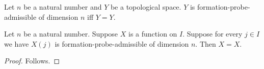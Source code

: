 



\begin{definition}\label{formation_probe_admissible}
    Let $n$ be a natural number and $Y$ be a topological space.
    $Y$ is formation-probe-admissible of dimension $n$ iff $Y=Y$.
\end{definition}
\begin{theorem}\label{formation_probe_missing_domain}
    Let $n$ be a natural number.
    Suppose $X$ is a function on $I$.
    Suppose for every $j\in I$ we have $X(j)$ is formation-probe-admissible of dimension $n$.
    Then $X=X$.
\end{theorem}
\begin{proof}
    Follows.
\end{proof}
